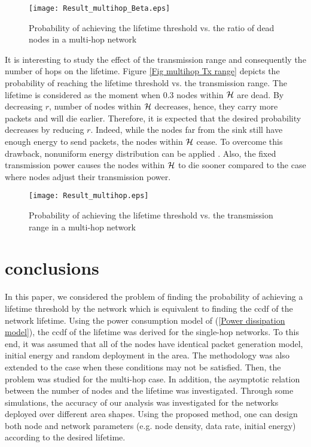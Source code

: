 \documentclass[conference]{IEEEtran}
\begin{document}
\begin{figure}[!h]
\centering
\texttt{[image: Result\_multihop\_Beta.eps]}
\caption{Probability of achieving the lifetime threshold vs. the
ratio of dead nodes in a multi-hop network} \label{Fig Beta
Multihop}
\end{figure}

It is interesting to study the effect of the transmission range and
consequently the number of hops on the lifetime. Figure \ref{Fig
multihop Tx range} depicts the probability of reaching the lifetime
threshold vs. the transmission range. The lifetime is considered as
the moment when 0.3 nodes within $\cal{H}$ are dead. By
decreasing $r$, number of nodes within $\cal{H}$ decreases, hence,
they carry more packets and will die earlier. Therefore, it is
expected that the desired probability decreases by reducing $r$.
Indeed, while the nodes far from the sink still have enough energy
to send packets, the nodes within $\cal{H}$ cease. To overcome this
drawback, nonuniform energy distribution can be applied
\cite{IEEE_Monograph}. Also, the fixed transmission power causes the
nodes within $\cal{H}$ to die sooner compared to the case where nodes adjust their transmission power.

\begin{figure}[!h]
\centering
\texttt{[image: Result\_multihop.eps]}
\caption{Probability of achieving the lifetime threshold vs. the
transmission range in a multi-hop network} \label{Fig multihop Tx
range}
\end{figure}

\section{conclusions}\label{Section Conclusion}
In this paper, we considered the problem of finding the probability
of achieving a lifetime threshold by the network which is equivalent
to finding the ccdf of the network lifetime. Using the power
consumption model of (\ref{Power dissipation model}), the ccdf of
the lifetime was derived for the single-hop networks. To this end,
it was assumed that all of the nodes have identical packet
generation model, initial energy and random deployment in the area.
The methodology was also extended to the case when these conditions
may not be satisfied. Then, the problem was studied for the
multi-hop case. In addition, the asymptotic relation between the
number of nodes and the lifetime was investigated. Through some
simulations, the accuracy of our analysis was investigated for the
networks deployed over different area shapes. Using the proposed
method, one can design both node and network parameters (e.g. node
density, data rate, initial energy) according to the desired
lifetime.
\end{document}
